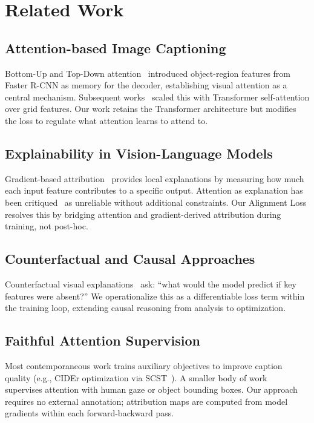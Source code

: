\documentclass[conference]{IEEEtran}
\begin{document}
\section{Related Work}
\label{sec:related}

\subsection{Attention-based Image Captioning}

Bottom-Up and Top-Down attention~\cite{b10} introduced object-region features from Faster R-CNN as memory for the decoder, establishing visual attention as a central mechanism. Subsequent works~\cite{b11} scaled this with Transformer self-attention over grid features. Our work retains the Transformer architecture but modifies the loss to regulate what attention learns to attend to.

\subsection{Explainability in Vision-Language Models}

Gradient-based attribution~\cite{b9,b7} provides local explanations by measuring how much each input feature contributes to a specific output. Attention as explanation has been critiqued~\cite{b12} as unreliable without additional constraints. Our Alignment Loss resolves this by bridging attention and gradient-derived attribution during training, not post-hoc.

\subsection{Counterfactual and Causal Approaches}

Counterfactual visual explanations~\cite{b13} ask: ``what would the model predict if key features were absent?'' We operationalize this as a differentiable loss term within the training loop, extending causal reasoning from analysis to optimization.

\subsection{Faithful Attention Supervision}

Most contemporaneous work trains auxiliary objectives to improve caption quality (e.g., CIDEr optimization via SCST~\cite{b14}). A smaller body of work~\cite{b15} supervises attention with human gaze or object bounding boxes. Our approach requires no external annotation; attribution maps are computed from model gradients within each forward-backward pass.
\end{document}
